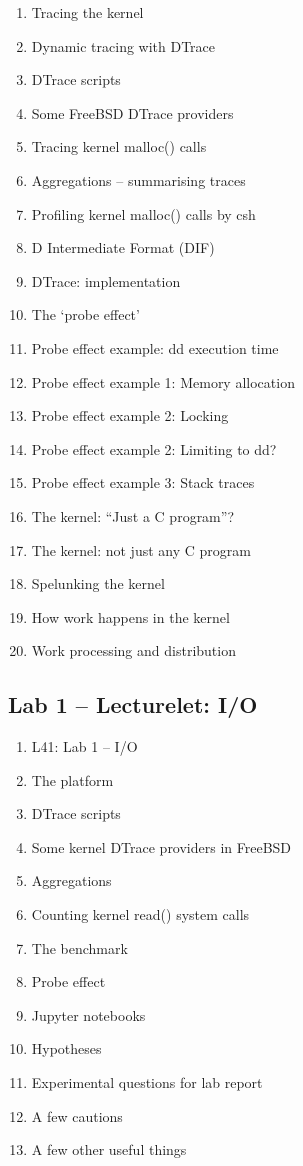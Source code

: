 \documentclass[a4paper,10pt]{article}
\begin{document}
\begin{enumerate}
  \item Tracing the kernel
  \item Dynamic tracing with DTrace
  \item DTrace scripts
  \item Some FreeBSD DTrace providers
  \item Tracing kernel malloc() calls
  \item Aggregations -- summarising traces
  \item Profiling kernel malloc() calls by csh
  \item D Intermediate Format (DIF)
  \item DTrace: implementation
  \item The `probe effect'
  \item Probe effect example: dd execution time
  \item Probe effect example 1: Memory allocation
  \item Probe effect example 2: Locking
  \item Probe effect example 2: Limiting to dd?
  \item Probe effect example 3: Stack traces
  \item The kernel: ``Just a C program''?
  \item The kernel: not just any C program
  \item Spelunking the kernel
  \item How work happens in the kernel
  \item Work processing and distribution
\end{enumerate}

\subsection*{Lab 1 -- Lecturelet: I/O}

\begin{enumerate}
  \item L41: Lab 1 -- I/O
  \item The platform
  \item DTrace scripts
  \item Some kernel DTrace providers in FreeBSD
  \item Aggregations
  \item Counting kernel read() system calls
  \item The benchmark
  \item Probe effect
  \item Jupyter notebooks
  \item Hypotheses
  \item Experimental questions for lab report
  \item A few cautions
  \item A few other useful things
\end{enumerate}
\end{document}

